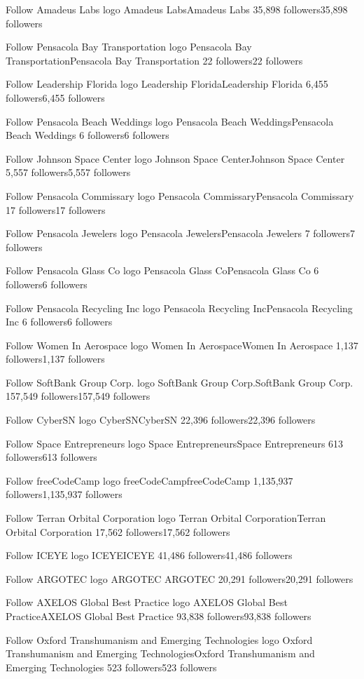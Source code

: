Follow
Amadeus Labs logo
Amadeus LabsAmadeus Labs
35,898 followers35,898 followers

Follow
Pensacola Bay Transportation logo
Pensacola Bay TransportationPensacola Bay Transportation
22 followers22 followers

Follow
Leadership Florida logo
Leadership FloridaLeadership Florida
6,455 followers6,455 followers

Follow
Pensacola Beach Weddings logo
Pensacola Beach WeddingsPensacola Beach Weddings
6 followers6 followers

Follow
Johnson Space Center logo
Johnson Space CenterJohnson Space Center
5,557 followers5,557 followers

Follow
Pensacola Commissary logo
Pensacola CommissaryPensacola Commissary
17 followers17 followers

Follow
Pensacola Jewelers logo
Pensacola JewelersPensacola Jewelers
7 followers7 followers

Follow
Pensacola Glass Co logo
Pensacola Glass CoPensacola Glass Co
6 followers6 followers

Follow
Pensacola Recycling Inc logo
Pensacola Recycling IncPensacola Recycling Inc
6 followers6 followers

Follow
Women In Aerospace logo
Women In AerospaceWomen In Aerospace
1,137 followers1,137 followers

Follow
SoftBank Group Corp. logo
SoftBank Group Corp.SoftBank Group Corp.
157,549 followers157,549 followers

Follow
CyberSN logo
CyberSNCyberSN
22,396 followers22,396 followers

Follow
Space Entrepreneurs logo
Space EntrepreneursSpace Entrepreneurs
613 followers613 followers

Follow
freeCodeCamp logo
freeCodeCampfreeCodeCamp
1,135,937 followers1,135,937 followers

Follow
Terran Orbital Corporation logo
Terran Orbital CorporationTerran Orbital Corporation
17,562 followers17,562 followers

Follow
ICEYE logo
ICEYEICEYE
41,486 followers41,486 followers

Follow
ARGOTEC  logo
ARGOTEC ARGOTEC 
20,291 followers20,291 followers

Follow
AXELOS Global Best Practice logo
AXELOS Global Best PracticeAXELOS Global Best Practice
93,838 followers93,838 followers

Follow
Oxford Transhumanism and Emerging Technologies logo
Oxford Transhumanism and Emerging TechnologiesOxford Transhumanism and Emerging Technologies
523 followers523 followers

